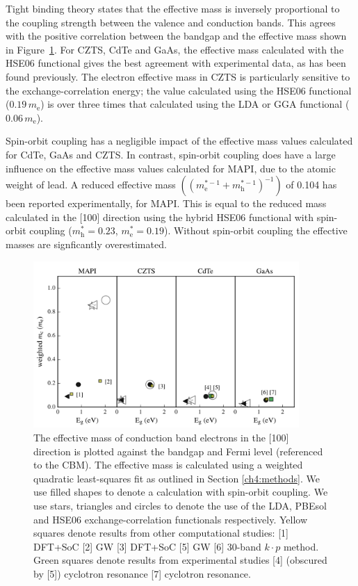 Tight binding theory states that the effective mass is inversely proportional to the coupling strength between the valence and conduction bands.\autocite{Kittel2005} 
This agrees with the positive correlation between the bandgap and the effective mass shown in Figure\ \ref{m*_bandgap_plot}.
For CZTS, CdTe and GaAs, the effective mass calculated with the HSE06 functional gives the best agreement with experimental data, as has been found previously.\autocite{Kim2010} 
The electron effective mass in CZTS is particularly sensitive to the exchange-correlation energy; the value calculated using the HSE06 functional ($0.19\,m_{\text{e}}$) is over three times that calculated using the LDA or GGA functional ($0.06\,m_\text{e}$).

Spin-orbit coupling has a negligible impact of the effective mass values calculated for CdTe, GaAs and CZTS.
In contrast, spin-orbit coupling does have a large influence on the effective mass values calculated for MAPI, due to the atomic weight of lead. 
A reduced effective mass $((m^{*-1}_{\text{e}}+m^{*-1}_{\text{h}})^{-1})$ of 0.104 has been reported experimentally,\autocite{Miyata2015} for MAPI.
This is equal to the reduced mass calculated in the [100] direction using the hybrid HSE06 functional with spin-orbit coupling ($m^*_{\text{h}}=0.23$, $m^*_{\text{e}}=0.19$). 
Without spin-orbit coupling the effective masses are signficantly overestimated. 

\begin{figure}[tb] \centering
\includegraphics[width=0.9\textwidth]{./figures/ch4/m_bandgap_plot.png}
\caption[Effective mass vs bandgap]{\label{m*_bandgap_plot}The effective mass of conduction band electrons in the [100] direction is plotted against the bandgap and Fermi level (referenced to the CBM). The effective mass is calculated using a weighted quadratic least-squares fit as outlined in Section \ref{ch4:methods}. We use filled shapes to denote a calculation with spin-orbit coupling. We use stars, triangles and circles to denote the use of the LDA, PBEsol and HSE06 exchange-correlation functionals respectively. Yellow squares denote results from other computational studies: [1] DFT+SoC\autocite{Filip2015} [2] GW\autocite{Filip2015} [3] DFT+SoC\autocite{Liu2012} [5] GW\autocite{Deguchi2016}  [6] 30-band $k\cdot p$ method.\autocite{Richard2004} Green squares denote results from experimental studies [4] (obscured by [5]) cyclotron resonance\autocite{Madelung2004} [7] cyclotron resonance.\autocite{Madelung2004}}
\end{figure}

